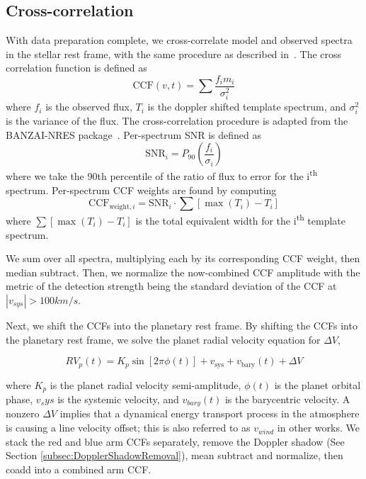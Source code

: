\documentclass[twocolumn]{aastex631}
\begin{document}
        \subsection{Cross-correlation}\label{subsec:cross-correlation}
            With data preparation complete, we cross-correlate model and observed spectra in the stellar rest frame, with the same procedure as described in~\citet{Johnson2023}. The cross correlation function is defined as
            \begin{equation}
                \text{CCF}(v,t) = \sum\frac{f_im_i}{\sigma_i^{2}} 
            \end{equation}
            where $f_i$ is the observed flux, $T_i$ is the doppler shifted template spectrum, and $\sigma_i^2$ is the variance of the flux. The cross-correlation procedure is adapted from the BANZAI-NRES package~\citep{McCully2022}. Per-spectrum SNR is defined as
            \begin{equation}
                \text{SNR}_i = P_{90}\left(\frac{f_i}{\sigma_i}\right)
            \end{equation}
            where we take the 90th percentile of the ratio of flux to error for the i\textsuperscript{th} spectrum. Per-spectrum CCF weights are found by computing
            \begin{equation}
                    \text{CCF}_{\text{weight}, i} = \text{SNR}_i  \cdot \sum [ \max(T_i) - T_i ]
            \end{equation}
            where $\sum [ \max(T_i) - T_i ]$ is the total equivalent width for the i\textsuperscript{th} template spectrum.

            We sum over all spectra, multiplying each by its corresponding CCF weight, then median subtract. Then, we normalize the now-combined CCF amplitude with the metric of the detection strength being the standard deviation of the CCF at $|v_{sys}| > 100 km/s$.
            

            Next, we shift the CCFs into the planetary rest frame. By shifting the CCFs into the planetary rest frame, we solve the planet radial velocity equation for $\Delta V$,
            
            \begin{equation} 
                RV_p(t) = K_p\sin[2\pi\phi(t)] + v_{\text{sys}} + v_{\text{bary}}(t) + \Delta V 
            \end{equation}

            where $K_p$ is the planet radial velocity semi-amplitude, $\phi(t)$ is the planet orbital phase, $v_sys$ is the systemic velocity, and $v_{bary}(t)$ is the barycentric velocity. A nonzero $\Delta V$ implies that a dynamical energy transport process in the atmosphere is causing a line velocity offset; this is also referred to as $v_{wind}$ in other works. We stack the red and blue arm CCFs separately, remove the Doppler shadow (See Section \ref{subsec:DopplerShadowRemoval}), mean subtract and normalize, then coadd into a combined arm CCF.
\end{document}
